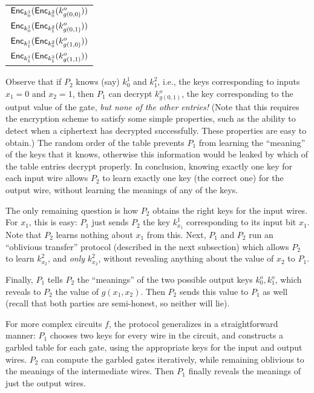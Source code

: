 \documentclass[11pt]{article}
\begin{document}
\begin{center}
  \begin{tabular}{|c|}
    \hline
    $\mathsf{Enc}_{k^1_0}(\mathsf{Enc}_{k^2_0}(k^o_{g(0,0)}))$ \\
    $\mathsf{Enc}_{k^1_0}(\mathsf{Enc}_{k^2_1}(k^o_{g(0,1)}))$ \\
    $\mathsf{Enc}_{k^1_1}(\mathsf{Enc}_{k^2_0}(k^o_{g(1,0)}))$ \\
    $\mathsf{Enc}_{k^1_1}(\mathsf{Enc}_{k^2_1}(k^o_{g(1,1)}))$ \\ \hline
  \end{tabular}
\end{center}

Observe that if $P_{2}$ knows (say) $k^{1}_{0}$ and $k^{2}_{1}$, i.e.,
the keys corresponding to inputs $x_{1}=0$ and $x_{2} = 1$, then
$P_{1}$ can decrypt $k^{o}_{g(0,1)}$, the key corresponding to the
output value of the gate, \emph{but none of the other entries!}  (Note
that this requires the encryption scheme to satisfy some simple
properties, such as the ability to detect when a ciphertext has
decrypted successfully.  These properties are easy to obtain.)  The
random order of the table prevents $P_{1}$ from learning the
``meaning'' of the keys that it knows, otherwise this information
would be leaked by which of the table entries decrypt properly.  In
conclusion, knowing exactly one key for each input wire allows $P_{2}$
to learn exactly one key (the correct one) for the output wire,
without learning the meanings of any of the keys.

The only remaining question is how $P_{2}$ obtains the right keys for
the input wires.  For $x_{1}$, this is easy: $P_1$ just sends $P_2$
the key $k^{1}_{x_{1}}$ corresponding to its input bit $x_{1}$.  Note
that $P_2$ learns nothing about $x_1$ from this.  Next, $P_1$ and
$P_2$ run an ``oblivious transfer'' protocol (described in the next
subsection) which allows $P_2$ to learn $k^{2}_{x_{2}}$, and
\emph{only} $k^{2}_{x_{2}}$, without revealing anything about the
value of $x_{2}$ to $P_{1}$.

Finally, $P_{1}$ tells $P_{2}$ the ``meanings'' of the two possible
output keys $k^{o}_{0}, k^{o}_{1}$, which reveals to $P_{2}$ the value
of $g(x_{1}, x_{2})$.  Then $P_{2}$ sends this value to $P_{1}$ as
well (recall that both parties are semi-honest, so neither will lie).

For more complex circuits $f$, the protocol generalizes in a
straightforward manner: $P_{1}$ chooses two keys for every wire in the
circuit, and constructs a garbled table for each gate, using the
appropriate keys for the input and output wires.  $P_{2}$ can compute
the garbled gates iteratively, while remaining oblivious to the
meanings of the intermediate wires.  Then $P_{1}$ finally reveals the
meanings of just the output wires.
\end{document}

